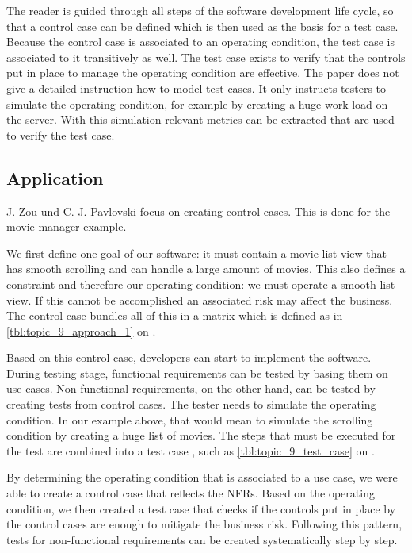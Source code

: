 The reader is guided through all steps of the software development life cycle, so that a control case can be defined which is then used as the basis for a test case. Because the control case is associated to an operating condition, the test case is associated to it transitively as well.
The test case exists to verify that the controls put in place to manage the operating condition are effective.
\newpage
The paper does not give a detailed instruction how to model test cases. It only instructs testers to simulate the operating condition, for example by creating a huge work load on the server.
With this simulation relevant metrics can be extracted that are used to verify the test case.



\subsection{Application}

J. Zou und C. J. Pavlovski focus on creating control cases. This is done for the movie manager example.

We first define one goal of our software:
it must contain a movie list view that has smooth scrolling and can handle a large amount of movies.
This also defines a constraint and therefore our operating condition: we must operate a smooth list view.
If this cannot be accomplished an associated risk may affect the business. The control case bundles all of this in a matrix which is defined as in \autoref{tbl:topic_9_approach_1} on .

Based on this control case, developers can start to implement the software. During
testing stage, functional requirements can be tested by basing them on use cases. Non-functional requirements, on the other hand, can be tested by creating tests from control cases.
The tester needs to simulate the operating condition.
In our example above, that would mean to simulate the scrolling condition by creating a huge list of movies.
The steps that must be executed for the test are combined into a test case , such as \autoref{tbl:topic_9_test_case} on .

By determining the operating condition that is associated to a use case, we were able to create a control case that reflects the NFRs.
Based on the operating condition, we then created a test case that checks if the controls put in place by the control cases are enough to mitigate the business risk.
Following this pattern, tests for non-functional requirements can be created systematically step by step.


